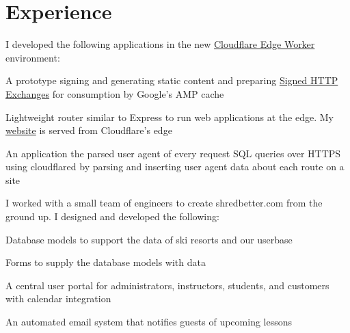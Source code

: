 \documentclass[letterpaper]{deedy-resume} %
\begin{document}
\begin{minipage}[t]{0.64\textwidth} %


\section*{Experience}


\sectionspace
I developed the following applications in the new \href{https://cloudflareworkers.com}{Cloudflare Edge Worker} environment:
\sectionspace
\begin {tightitemize}
\item A prototype signing and generating static content and preparing \href{https://tools.ietf.org/html/draft-yasskin-http-origin-signed-responses-04}{Signed HTTP Exchanges} for consumption by Google's AMP cache
\item Lightweight router similar to Express to run web applications at the edge. My \href{https://averyharnish.com}{website} is served from Cloudflare's edge
\item An application the parsed user agent of every request SQL queries over HTTPS using cloudflared by parsing and inserting user agent data about each route on a site
\end {tightitemize}
\sectionspace
{}

I worked with a small team of engineers to create shredbetter.com from the ground up. I designed and developed the following:
\begin{tightitemize}
\item Database models to support the data of ski resorts and our userbase
\item Forms to supply the database models with data
\item A central user portal for administrators, instructors, students, and customers with calendar integration
\item An automated email system that notifies guests of upcoming lessons
\end{tightitemize}
\sectionspace
{}


\end{minipage}
\end{document}
